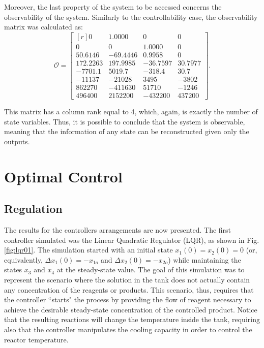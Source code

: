 \documentclass[a4paper,11pt]{book}
\numberwithin{figure}{chapter}
\numberwithin{equation}{chapter}
\numberwithin{table}{chapter}
\theoremstyle{definition}
\begin{document}
Moreover, the last property of the system to be accessed concerns the observability of the system. Similarly to the controllability case, the observability matrix was calculated as:
\begin{equation}
	\bm{\mathcal{O}} = \begin{bmatrix*}[r]
         0 &   1.0000 &        0  &       0 \\	
         0 &        0 &   1.0000  &       0 \\ 
   50.6146 & -69.4446 &   0.9958  &       0 \\
  172.2263 & 197.9985 & -36.7597  & 30.7977 \\
   -7701.1 &   5019.7 &  -318.4  &  30.7 \\
   -11137 &  -21028 &   3495 &  -3802 \\
   862270  & -411630  &  51710  & -1246 \\
   496400  &  2152200 &  -432200  &  437200
	\end{bmatrix*}
.\end{equation}

\noindent This matrix has a column rank equal to 4, which, again, is exactly the number of state variables. Thus, it is possible to conclude that the system is observable, meaning that the information of any state can be reconstructed given only the outputs. 

\section{Optimal Control}

\subsection{Regulation}

The results for the controllers arrangements are now presented. The first controller simulated was the Linear Quadratic Regulator (LQR), as shown in Fig. \ref{fig:lqr01}. The simulation started with an initial state $x_1(0) = x_2(0) = 0$ (or, equivalently, $\Delta x_1(0) = -x_{1o}$ and $\Delta x_2(0) = -x_{2o}$) while maintaining the states $x_3$ and $x_4$ at the steady-state value. The goal of this simulation was to represent the scenario where the solution in the tank does not actually contain any concentration of the reagents or products. This scenario, thus, requires that the controller ``starts" the process by providing the flow of reagent necessary to achieve the desirable steady-state concentration of the controlled product. Notice that the resulting reactions will change the temperature inside the tank, requiring also that the controller manipulates the cooling capacity in order to control the reactor temperature.
\end{document}
